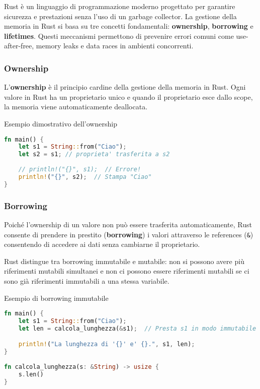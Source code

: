Rust è un linguaggio di programmazione moderno progettato per garantire sicurezza e prestazioni senza l'uso di un garbage collector. La gestione della memoria in Rust si basa su tre concetti fondamentali: \textbf{ownership}, \textbf{borrowing} e \textbf{lifetimes}. Questi meccanismi permettono di prevenire errori comuni come use-after-free, memory leaks e data races in ambienti concorrenti.

\subsubsection{Ownership}

L'\textbf{ownership} è il principio cardine della gestione della memoria in Rust. Ogni valore in Rust ha un proprietario unico e quando il proprietario esce dallo scope, la memoria viene automaticamente deallocata.

\begin{algorithm}[ht]
    \caption{Esempio dimostrativo dell'ownership}
    \label{lst:ownership}
    \begin{lstlisting}[language=Rust, style=colouredRust]
fn main() {
    let s1 = String::from("Ciao");
    let s2 = s1; // proprieta' trasferita a s2
   
    // println!("{}", s1);  // Errore!
    println!("{}", s2);  // Stampa "Ciao"
}
\end{lstlisting}
\end{algorithm}


\subsubsection{Borrowing}

Poiché l'ownership di un valore non può essere trasferita automaticamente, Rust consente di prendere in prestito (\textbf{borrowing}) i valori attraverso le references (\texttt{\&}) consentendo di accedere ai dati senza cambiarne il proprietario.

Rust distingue tra borrowing immutabile e mutabile: non si possono avere più riferimenti mutabili simultanei e non ci possono essere riferimenti mutabili se ci sono già riferimenti immutabili a una stessa variabile.

\begin{algorithm}[ht]
    \caption{Esempio di borrowing immutabile}
    \label{lst:borrowing_immutabile}
    \begin{lstlisting}[language=Rust, style=colouredRust]
fn main() {
    let s1 = String::from("Ciao");
    let len = calcola_lunghezza(&s1);  // Presta s1 in modo immutabile

    println!("La lunghezza di '{}' e' {}.", s1, len);
}
        
fn calcola_lunghezza(s: &String) -> usize {
    s.len()
}
\end{lstlisting}
\end{algorithm}

